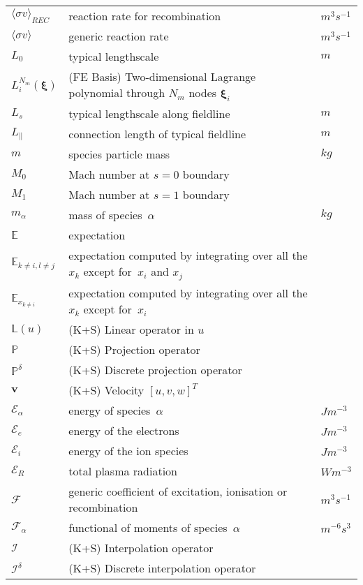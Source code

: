 \begin{longtable}{|p{3.0cm}|p{10.0cm}|p{3.0cm}|}
$\langle \sigma v \rangle_{REC}$ & reaction rate for recombination  & $m^3 s^{-1}$ \\
$\langle\sigma v\rangle$ & generic reaction rate  & $m^3 s^{-1}$ \\
$L_0$ & typical lengthscale  & $m$ \\
$L_i^{N_m}(\boldsymbol{\xi})$ &  (FE Basis) Two-dimensional Lagrange polynomial through $N_m$ nodes ${\mathbf \xi}_i$ & \\
$L_s$ & typical lengthscale along fieldline  & $m$ \\
$L_{\|}$ & connection length of typical fieldline  & $m$ \\
$m$ & species particle mass & $kg$ \\
$M_0$ & Mach number at $s=0$ boundary & \\
$M_1$ & Mach number at $s=1$ boundary & \\
$m_\alpha$ & mass of species~$\alpha$ & $kg$ \\
$\mathbb{E}$ & expectation  & \\
$\mathbb{E}_{k\neq i, l\neq j}$ & expectation computed by integrating over all the $x_k$ except for~$x_i$ and  $x_j$  & \\
$\mathbb{E}_{x_{k\neq i}}$ & expectation computed by integrating over all the $x_k$ except for~$x_i$  & \\
$\mathbb{L}(u)$ &  (K+S) Linear operator in $u$ & \\
$\mathbb{P}$ &  (K+S) Projection operator & \\
$\mathbb{P}^{\delta}$ &  (K+S) Discrete projection operator & \\
${\mathbf v}$ &  (K+S) Velocity $[u, v, w]^T$ & \\
$\mathcal{E}_\alpha$ & energy of species~$\alpha$ & $J m^{-3}$ \\
$\mathcal{E}_e$ & energy of the electrons & $J m^{-3}$ \\
$\mathcal{E}_i$ & energy of the ion species & $J m^{-3}$ \\
$\mathcal{E}_R$ & total plasma radiation & $W m^{-3}$ \\
$\mathcal{F}$ & generic coefficient of excitation, ionisation or recombination  & $m^3 s^{-1}$ \\
$\mathcal{F}_\alpha$ & functional of moments of species~$\alpha$  & $m^{-6} s^3$ \\
$\mathcal{I}$ &  (K+S) Interpolation operator & \\
$\mathcal{I}^{\delta}$ &  (K+S) Discrete interpolation operator & \\

\end{longtable}
